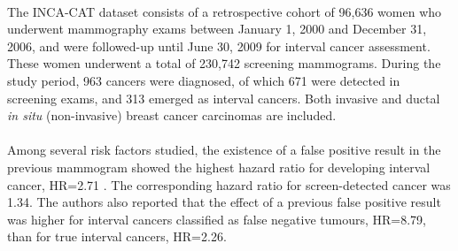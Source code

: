 \paragraph{}The INCA-CAT dataset consists of a retrospective cohort of 96,636 women who underwent
mammography exams between January 1, 2000 and December 31, 2006, and were followed-up until June
30, 2009 for interval cancer assessment. These women underwent a total of 230,742 screening
mammograms. During the study period, 963 cancers were diagnosed, of which 671 were detected in screening exams, and 313 emerged as interval cancers. Both invasive and ductal \textit{in situ} (non-invasive) breast cancer carcinomas are included. 

\paragraph{} Among several risk factors studied, the existence of a false positive result in the previous mammogram showed the highest hazard ratio for developing interval cancer, HR=2.71 \cite{Blanch2014}. The corresponding hazard ratio for screen-detected cancer was 1.34. The authors also reported that the effect of a previous false positive result was higher for interval cancers classified as false negative tumours, HR=8.79, than for true interval cancers, HR=2.26.



